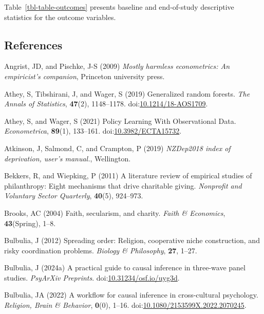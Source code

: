 \documentclass[
  single column]{article}
\newlength{\cslhangindent}
\newenvironment{CSLReferences}[2] %
 {\begin{list}{}{%
  \setlength{\itemindent}{0pt}
  \setlength{\leftmargin}{0pt}
  \setlength{\parsep}{0pt}
  \ifodd #1
   \setlength{\leftmargin}{\cslhangindent}
   \setlength{\itemindent}{-1\cslhangindent}
  \fi
  \setlength{\itemsep}{#2\baselineskip}}}
 {\end{list}}
\begin{document}
Table~\ref{tbl-table-outcomes} presents baseline and end-of-study
descriptive statistics for the outcome variables.

\newpage{}

\subsection*{References}\label{references}

\label{refs}
\begin{CSLReferences}{1}{0}
Angrist, JD, and Pischke, J-S (2009) \emph{Mostly harmless econometrics:
An empiricist's companion}, Princeton university press.

Athey, S, Tibshirani, J, and Wager, S (2019) Generalized random forests.
\emph{The Annals of Statistics}, \textbf{47}(2), 1148--1178.
doi:\href{https://doi.org/10.1214/18-AOS1709}{10.1214/18-AOS1709}.

Athey, S, and Wager, S (2021) Policy Learning With Observational Data.
\emph{Econometrica}, \textbf{89}(1), 133--161.
doi:\href{https://doi.org/10.3982/ECTA15732}{10.3982/ECTA15732}.

Atkinson, J, Salmond, C, and Crampton, P (2019) \emph{NZDep2018 index of
deprivation, user{'}s manual.}, Wellington.

Bekkers, R, and Wiepking, P (2011) A literature review of empirical
studies of philanthropy: Eight mechanisms that drive charitable giving.
\emph{Nonprofit and Voluntary Sector Quarterly}, \textbf{40}(5),
924--973.

Brooks, AC (2004) Faith, secularism, and charity. \emph{Faith \&
Economics}, \textbf{43}(Spring), 1--8.

Bulbulia, J (2012) Spreading order: Religion, cooperative niche
construction, and risky coordination problems. \emph{Biology \&
Philosophy}, \textbf{27}, 1--27.

Bulbulia, J (2024a) A practical guide to causal inference in three-wave
panel studies. \emph{PsyArXiv Preprints}.
doi:\href{https://doi.org/10.31234/osf.io/uyg3d}{10.31234/osf.io/uyg3d}.

Bulbulia, JA (2022) A workflow for causal inference in cross-cultural
psychology. \emph{Religion, Brain \& Behavior}, \textbf{0}(0), 1--16.
doi:\href{https://doi.org/10.1080/2153599X.2022.2070245}{10.1080/2153599X.2022.2070245}.


\end{CSLReferences}
\end{document}

